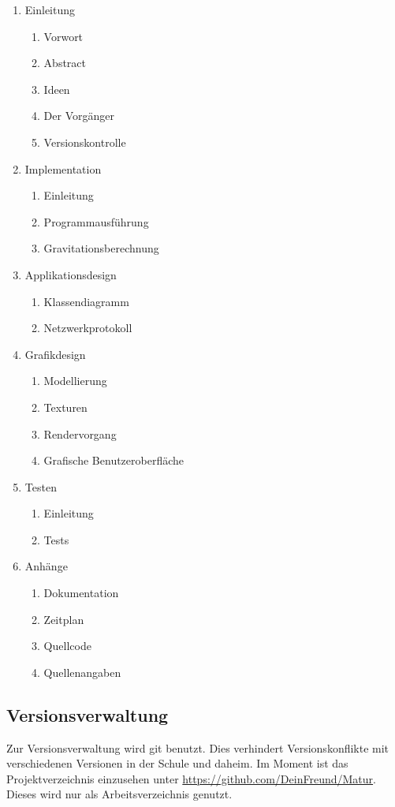 \documentclass[a4paper]{article}
\begin{document}
\begin{enumerate}
  \item Einleitung
  \begin{enumerate}
    \item Vorwort
    \item Abstract
    \item Ideen
    \item Der Vorgänger
    \item Versionskontrolle
  \end{enumerate}
  \item Implementation
  \begin{enumerate}
    \item Einleitung
    \item Programmausführung
    \item Gravitationsberechnung
  \end{enumerate}
  \item Applikationsdesign
  \begin{enumerate}
    \item Klassendiagramm
    \item Netzwerkprotokoll
  \end{enumerate}
  \item Grafikdesign
  \begin{enumerate}
    \item Modellierung
    \item Texturen
    \item Rendervorgang
    \item Grafische Benutzeroberfläche
  \end{enumerate}
  \item Testen
  \begin{enumerate}
    \item Einleitung
    \item Tests
  \end{enumerate}
  \item Anhänge
  \begin{enumerate}
    \item Dokumentation
    \item Zeitplan
    \item Quellcode
    \item Quellenangaben
  \end{enumerate}
\end{enumerate}

\subsection{Versionsverwaltung}
Zur Versionsverwaltung wird git benutzt. Dies verhindert Versionskonflikte mit verschiedenen Versionen in der Schule und daheim. Im Moment ist das Projektverzeichnis einzusehen unter \url{https://github.com/DeinFreund/Matur}. Dieses wird nur als Arbeitsverzeichnis genutzt.
\end{document}
